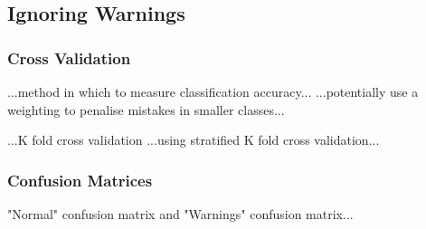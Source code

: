 \subsection{Ignoring Warnings}

\subsubsection{Cross Validation}

...method in which to measure classification accuracy...
...potentially use a weighting to penalise mistakes in smaller classes...

...K fold cross validation
...using stratified K fold cross validation...

\subsubsection{Confusion Matrices}
"Normal" confusion matrix and "Warnings" confusion matrix...

